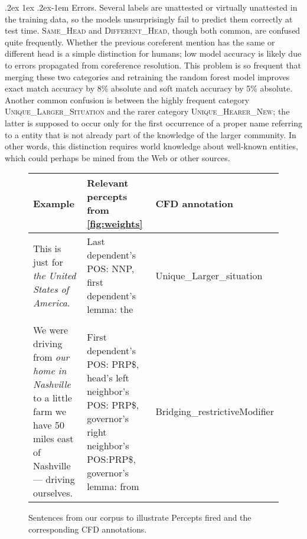 \documentclass[11pt,letterpaper]{article}
\makeatletter
\newcommand{\ensuretext}[1]{#1}
\newcommand{\nssmarker}{\ensuretext{\textcolor{magenta}{\ensuremath{^{\textsc{NS}}_{\textsc{S}}}}}}
\newcommand{\arkcomment}[3]{\ensuretext{\textcolor{#3}{[#1 #2]}}}
\newcommand{\nss}[1]{\arkcomment{\nssmarker}{#1}{magenta}}
\renewcommand{\paragraph}{%
  \@startsection{paragraph}{4}%
  {\z@}{.2ex \@plus 1ex \@minus .2ex}{-1em}%
  {\normalfont\normalsize\bfseries}%
}
\newcommand{\llbl}[1]{\mbox{\textsc{#1}}} %
\newcommand{\finalversion}[1]{}
\makeatother
\begin{document}
\paragraph{Errors.}
Several labels are unattested or virtually unattested in the training data, 
so the models unsurprisingly fail to predict them correctly at test time. 
\llbl{Same\_Head} and \llbl{Different\_Head}, though both common, are confused quite frequently.
Whether the previous coreferent mention has the same or different head is a simple distinction for humans; 
low model accuracy is likely due to errors propagated from coreference resolution.
This problem is so frequent that merging these two categories and retraining the random forest model 
improves exact match accuracy by 8\% absolute and soft match accuracy by 5\% absolute.
Another common confusion is between the highly frequent category \llbl{Unique\_Larger\_Situation}
and the rarer category \llbl{Unique\_Hearer\_New}; the latter is supposed to occur
only for the first occurrence of a proper name referring to a entity 
that is not already part of the knowledge of the larger community. 
In other words, this distinction requires world knowledge about well-known entities, which could perhaps be mined 
from the Web or other sources.

\finalversion{\nss{English: ±cost function, ±non-identity attributes, ±predicting intermediate labels}

\nss{maybe: which attribute groupings produce the best classifier, if we want to force a hierarchy}

\nss{feature/attribute ablations}}


\begin{figure}\small\centering  
   \begin{tabular}{p{}p{}p{}}
      \bf{Example} & \bf{Relevant percepts from \cref{fig:weights}} & \bf{CFD annotation} \\
      \midrule
      This is just for \emph{the United States of America}. & Last dependent's POS: NNP, first dependent's lemma: the & Unique\_Larger\_situation \\ \\
      We were driving from \emph{our home in Nashville} to a little farm we have 50 miles east of Nashville --- driving ourselves. & First dependent's POS: PRP\$, head's left neighbor's POS: PRP\$, governor's right neighbor's POS:PRP\$, governor's lemma: from & Bridging\_restrictiveModifier \\
\end{tabular}
\caption{Sentences from our corpus to illustrate Percepts fired and the corresponding CFD annotations.}
\label{fig:featureweights}
\end{figure}
\end{document}
